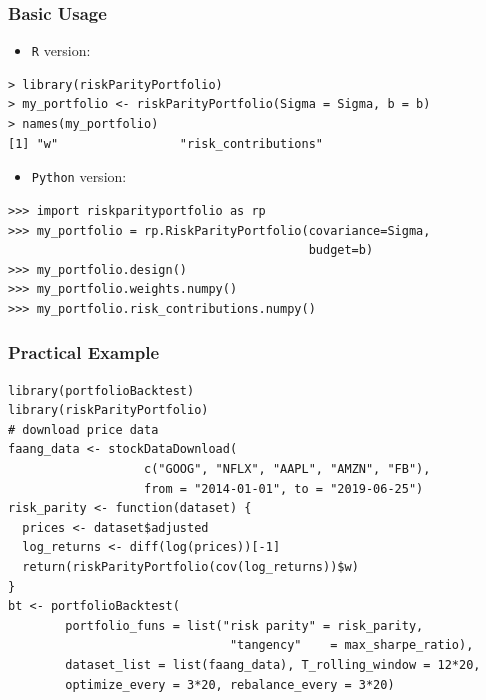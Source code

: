 \documentclass[aspectratio=169]{beamer}
\begin{document}
        \begin{frame}[fragile]
          \frametitle{Basic Usage}
          \vspace{.5cm}
          \begin{itemize}
            \item \texttt{R} version:
          \end{itemize}
            \pause
\begin{verbatim}
> library(riskParityPortfolio)
> my_portfolio <- riskParityPortfolio(Sigma = Sigma, b = b)
> names(my_portfolio)
[1] "w"                 "risk_contributions"
\end{verbatim}
            \pause
          \begin{itemize}
            \item \texttt{Python} version:
          \end{itemize}
\begin{verbatim}
>>> import riskparityportfolio as rp
>>> my_portfolio = rp.RiskParityPortfolio(covariance=Sigma,
                                          budget=b)
>>> my_portfolio.design()
>>> my_portfolio.weights.numpy()
>>> my_portfolio.risk_contributions.numpy()
\end{verbatim}
        \end{frame}

\begin{frame}[fragile]
\frametitle{Practical Example}
\vspace{.7cm}
\begin{verbatim}
library(portfolioBacktest)
library(riskParityPortfolio)
# download price data
faang_data <- stockDataDownload(
                   c("GOOG", "NFLX", "AAPL", "AMZN", "FB"),
                   from = "2014-01-01", to = "2019-06-25")
risk_parity <- function(dataset) {
  prices <- dataset$adjusted
  log_returns <- diff(log(prices))[-1]
  return(riskParityPortfolio(cov(log_returns))$w)
}
bt <- portfolioBacktest(
        portfolio_funs = list("risk parity" = risk_parity,
                               "tangency"    = max_sharpe_ratio),
        dataset_list = list(faang_data), T_rolling_window = 12*20,
        optimize_every = 3*20, rebalance_every = 3*20)
\end{verbatim}
\end{frame}
\end{document}
